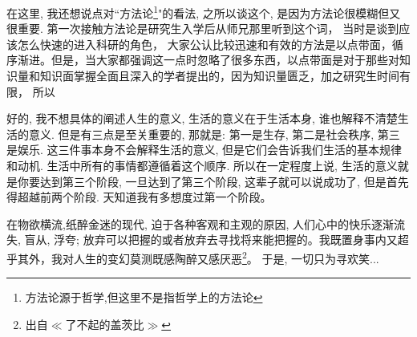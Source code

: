 \documentclass[utf8]{book}
\begin{document}
	在这里, 我还想说点对``方法论\footnote{方法论源于哲学,但这里不是指哲学上的方法论}"的看法, 之所以谈这个, 是因为方法论很模糊但又很重要. 第一次接触方法论是研究生入学后从师兄那里听到这个词， 当时是谈到应该怎么快速的进入科研的角色， 大家公认比较迅速和有效的方法是以点带面，循序渐进。但是，当大家都强调这一点时忽略了很多东西，以点带面是对于那些对知识量和知识面掌握全面且深入的学者提出的，因为知识量匮乏，加之研究生时间有限， 所以
	
	
	好的, 我不想具体的阐述人生的意义, 生活的意义在于生活本身, 谁也解释不清楚生活的意义. 但是有三点是至关重要的, 那就是: 第一是生存, 第二是社会秩序, 第三是娱乐. 这三件事本身不会解释生活的意义, 但是它们会告诉我们生活的基本规律和动机. 生活中所有的事情都遵循着这个顺序. 所以在一定程度上说, 生活的意义就是你要达到第三个阶段, 一旦达到了第三个阶段, 这辈子就可以说成功了, 但是首先得超越前两个阶段. 天知道我有多想度过第一个阶段。

	在物欲横流,纸醉金迷的现代, 迫于各种客观和主观的原因, 人们心中的快乐逐渐流失, 盲从, 浮夸; 放弃可以把握的或者放弃去寻找将来能把握的。我既置身事内又超乎其外，我对人生的变幻莫测既感陶醉又感厌恶\footnote{出自$\ll$了不起的盖茨比$\gg$}。 于是, 一切只为寻欢笑...
	
\end{document}
